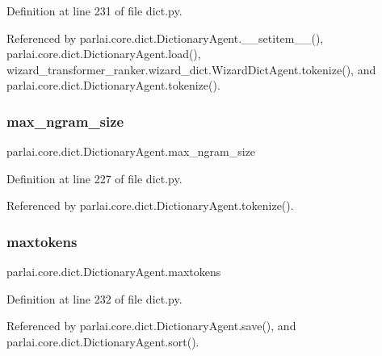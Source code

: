 Definition at line 231 of file dict.\+py.



Referenced by parlai.\+core.\+dict.\+Dictionary\+Agent.\+\_\+\+\_\+setitem\+\_\+\+\_\+(), parlai.\+core.\+dict.\+Dictionary\+Agent.\+load(), wizard\+\_\+transformer\+\_\+ranker.\+wizard\+\_\+dict.\+Wizard\+Dict\+Agent.\+tokenize(), and parlai.\+core.\+dict.\+Dictionary\+Agent.\+tokenize().

\mbox{\label{classparlai_1_1core_1_1dict_1_1DictionaryAgent_a834b2cdfb978f230b5131e63cf1e7492}} 
\subsubsection{\texorpdfstring{max\+\_\+ngram\+\_\+size}{max\_ngram\_size}}
{\footnotesize\ttfamily parlai.\+core.\+dict.\+Dictionary\+Agent.\+max\+\_\+ngram\+\_\+size}



Definition at line 227 of file dict.\+py.



Referenced by parlai.\+core.\+dict.\+Dictionary\+Agent.\+tokenize().

\mbox{\label{classparlai_1_1core_1_1dict_1_1DictionaryAgent_abeece13fbdc77b7479d4fb5d02858816}} 
\subsubsection{\texorpdfstring{maxtokens}{maxtokens}}
{\footnotesize\ttfamily parlai.\+core.\+dict.\+Dictionary\+Agent.\+maxtokens}



Definition at line 232 of file dict.\+py.



Referenced by parlai.\+core.\+dict.\+Dictionary\+Agent.\+save(), and parlai.\+core.\+dict.\+Dictionary\+Agent.\+sort().

